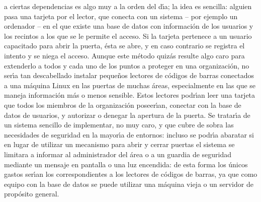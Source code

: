 a ciertas dependencias es algo muy a la orden del d\'{\i}a; la idea es 
sencilla: alguien pasa una tarjeta por el lector, que conecta con un sistema 
-- por ejemplo un ordenador -- en el que existe una base de datos con 
informaci\'on de los usuarios y los recintos a los que se le permite el acceso.
Si la tarjeta pertenece a un usuario capacitado para abrir la puerta, \'esta se
abre, y en caso contrario se registra el intento y se niega el acceso. Aunque 
este m\'etodo quiz\'as resulte algo caro para extenderlo a
todos y cada uno de los puntos a proteger en una organizaci\'on, no ser\'{\i}a 
tan descabellado instalar peque\~nos lectores de c\'odigos de barras conectados
a una m\'aquina Linux en las puertas de muchas \'areas, especialmente en las
que se maneja informaci\'on m\'as o menos sensible. Estos lectores podr\'{\i}an 
leer una tarjeta que todos los miembros de la organizaci\'on poseer\'{\i}an, 
conectar con la base de datos de usuarios, y autorizar o denegar la apertura de 
la puerta. Se 
tratar\'{\i}a de un sistema sencillo de implementar, no muy caro, y que cubre
de sobra las necesidades de seguridad en la mayor\'{\i}a de entornos:
incluso se podr\'{\i}a abaratar si en lugar de utilizar un mecanismo para abrir
y cerrar puertas el sistema se limitara a informar al administrador del \'area 
o a un guardia de seguridad mediante un mensaje en pantalla o una luz 
encendida: de esta forma
los \'unicos gastos ser\'{\i}an los correspondientes a los lectores de c\'odigos
de barras, ya que como equipo con la base de datos se puede utilizar una 
m\'aquina vieja o un servidor de prop\'osito general.
